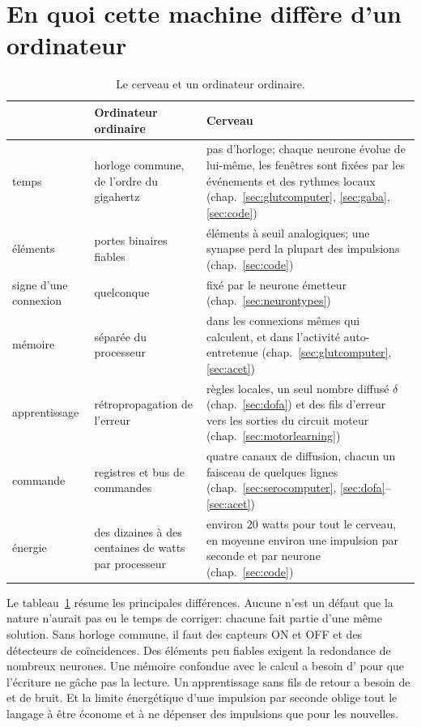 \section{En quoi cette machine diffère d'un ordinateur}

\begin{table}[t]
\centering
\footnotesize
\setlength{\tabcolsep}{4pt}
\renewcommand{\arraystretch}{1.15}
\begin{tabular}{>{\raggedright}p{2.2cm}>{\raggedright}p{4.2cm}>{\raggedright\arraybackslash}p{6.6cm}}
\toprule
& Ordinateur ordinaire & Cerveau \\
\midrule
temps & horloge commune, de l'ordre du gigahertz & pas d'horloge; chaque neurone évolue de lui-même, les fenêtres sont fixées par les événements et des rythmes locaux (chap.~\ref{sec:glutcomputer}, \ref{sec:gaba}, \ref{sec:code}) \\
éléments & portes binaires fiables & éléments à seuil analogiques; une synapse perd la plupart des impulsions (chap.~\ref{sec:code}) \\
signe d'une connexion & quelconque & fixé par le neurone émetteur (chap.~\ref{sec:neurontypes}) \\
mémoire & séparée du processeur & dans les connexions mêmes qui calculent, et dans l'activité auto-entretenue (chap.~\ref{sec:glutcomputer}, \ref{sec:acet}) \\
apprentissage & rétropropagation de l'erreur & règles locales, un seul nombre diffusé $\delta$ (chap.~\ref{sec:dofa}) et des fils d'erreur vers les sorties du circuit moteur (chap.~\ref{sec:motorlearning}) \\
commande & registres et bus de commandes & quatre canaux de diffusion, chacun un faisceau de quelques lignes (chap.~\ref{sec:serocomputer}, \ref{sec:dofa}--\ref{sec:acet}) \\
énergie & des dizaines à des centaines de watts par processeur & environ $20$ watts pour tout le cerveau, en moyenne environ une impulsion par seconde et par neurone (chap.~\ref{sec:code}) \\
\bottomrule
\end{tabular}
\caption{Le cerveau et un ordinateur ordinaire.}
\label{tab:computer}
\end{table}

Le tableau~\ref{tab:computer} résume les principales différences. Aucune n'est un défaut que la nature n'aurait pas eu le temps de corriger: chacune fait partie d'une même solution. Sans horloge commune, il faut des capteurs ON et OFF et des détecteurs de coïncidences. Des éléments peu fiables exigent la redondance de nombreux neurones. Une mémoire confondue avec le calcul a besoin d' pour que l'écriture ne gâche pas la lecture. Un apprentissage sans fils de retour a besoin de  et de bruit. Et la limite énergétique d'une impulsion par seconde oblige tout le langage à être économe et à ne dépenser des impulsions que pour les nouvelles.

